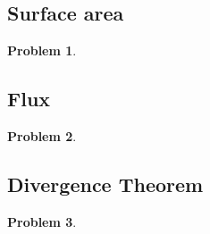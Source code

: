 \documentclass{article}
\newtheorem{problem}{Problem}
\begin{document}
\subsection{Surface area}
\begin{problem}

\end{problem}
\subsection{Flux}
\begin{problem}

\end{problem}
\subsection{Divergence Theorem}
\begin{problem}

\end{problem}
\end{document}
